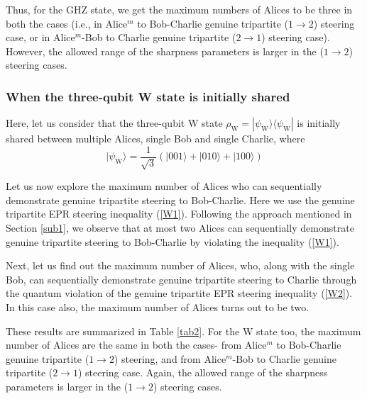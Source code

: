 \documentclass[pra,a4paper,aps,twocolumn,showpacs,superscriptaddress,groupedaddress]{revtex4}
\begin{document}
Thus, for the GHZ state, we get the maximum numbers of Alices to be three  in both the cases (i.e., in Alice$^m$ to Bob-Charlie genuine tripartite ($1 \rightarrow 2$) steering case, or in Alice$^m$-Bob to Charlie genuine tripartite ($2 \rightarrow 1$) steering case). However, the allowed range of the sharpness parameters is larger in the  ($1 \rightarrow 2$) steering cases.



\subsubsection{When the three-qubit W state is initially shared}
Here, let us consider that the three-qubit W state $\rho_{\text{W}} = | \psi_{\text{W}} \rangle \langle \psi_{\text{W}} |$ is initially shared between multiple Alices, single Bob and single Charlie, where
\begin{equation}
| \psi_{\text{W}} \rangle = \frac{1}{\sqrt{3}}(| 001\rangle + |010\rangle + |100 \rangle)
\label{wstate}
\end{equation} 

Let us now explore the maximum number of Alices who can  sequentially demonstrate genuine tripartite steering to Bob-Charlie. Here we  use the genuine tripartite EPR steering inequality (\ref{W1}). Following the approach mentioned in Section \ref{sub1}, we observe that at most two Alices can sequentially demonstrate genuine tripartite steering to Bob-Charlie by  violating the inequality (\ref{W1}).

 Next, let us find out the maximum number of Alices, who, along with the single Bob, can  sequentially demonstrate genuine tripartite steering to Charlie through the quantum  violation of the genuine tripartite EPR steering inequality (\ref{W2}). In this case also, the maximum number of Alices turns out to be two.

These results are summarized in Table \ref{tab2}. For the W state too, the maximum number of Alices are the same  in both the cases- from Alice$^m$ to Bob-Charlie genuine tripartite ($1 \rightarrow 2$) steering, and from Alice$^m$-Bob to Charlie genuine tripartite ($2 \rightarrow 1$) steering case. Again, the allowed range of the sharpness parameters is larger in the  ($1 \rightarrow 2$) steering cases.
\end{document}
